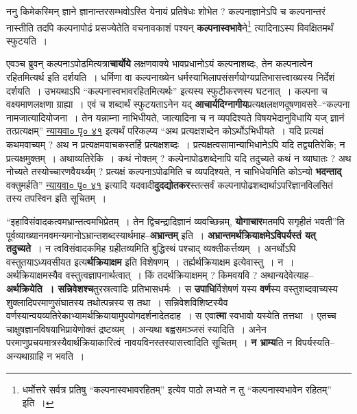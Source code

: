 \documentclass[article,12pt,a4paper]{memoir}
\begin{document}
	  \pstart ननु किमेकस्मिन् ज्ञाने ज्ञानान्तरसम्भवोऽस्ति येनायं प्रतिषेधः शोभेत ? कल्पनाज्ञानेऽपि च कल्पनान्तरं नास्तीति तदपि कल्पनापोढं प्रसज्येतेति वचनावकाशं पश्यन् \textbf{कल्पनास्वभावे}ने\footnote{धर्मोत्तरे सर्वत्र प्रतिषु “कल्पनास्वभावरहितम्” इत्येव पाठो लभ्यते न तु “कल्पनास्वभावेन रहितम्” इति ।} त्यादिनाऽस्य विवक्षितमर्थं स्फुटयति ।
	\pend
      

	  \pstart एवञ्च ब्रुवन् कल्पनाऽपोढमित्यत्रा\textbf{चार्योये} लक्षणवाक्ये भावप्रधानोऽयं कल्पनाशब्दः, तेन कल्पनात्वेन रहितमित्यर्थ इति दर्शयति । धर्मिणा वा कल्पनाख्येन धर्मस्याभिलापसंसर्गयोग्यप्रतिभासत्त्वाख्यस्य निर्देशं दर्शयति । उभयथाऽपि “कल्पनास्वभावरहितमित्यर्थः” इत्यस्य स्फुटीकरणस्य घटनात् । कल्पना च वक्ष्यमाणलक्षणा ग्राह्या । एवं च शब्दार्थं स्फुटयताऽनेन यद् \textbf{आचार्यदिग्नागीय}प्रत्यक्षलक्षणदूषणावसरे--“कल्पना नामजात्यादियोजना । तेन यन्नाम्ना नाभिधीयते, जात्यादिना च न व्यपदिश्यते विषयभेदानुविधायि यज् ज्ञानं तत्प्रत्यक्षम्” \href{http://http://sarit.indology.info/?cref=nv.1.1.p44.1}{न्यायवा० पृ० ४१} इत्यर्थं परिकल्प्य “अथ प्रत्यक्षशब्देन कोऽर्थोऽभिधीयते । यदि प्रत्यक्षं कथमवाच्यम् ? अथ न प्रत्यक्षमवाचकस्तर्हि प्रत्यक्षशब्दः । प्रत्यक्षत्वसामान्याभिधानेऽपि यदि तद्व्यतिरेकि; न प्रत्यक्षमुक्तम् । अथाव्यतिरेकि । कथं नोक्तम् ? कल्पेनापोढशब्देनापि यदि तदुच्यते कथं न व्याघातः ? अथ नोच्यते तस्योच्चारणवैयर्थ्यम् ? प्रत्यक्षं कल्पनाऽपोढमिति च व्यपदिश्यते, न चाभिधेयमिति कोऽन्यो \textbf{भदन्ताद्} वक्तुमर्हति” \href{http://http://sarit.indology.info/?cref=nv.1.1.p44-6-12}{न्यायवा० पृ० ४१} इत्यादि यदवादी\textbf{दुदद्योतकर}स्तत्सर्वं कल्पनापोढशब्दार्थाऽपरिज्ञानविलसितं तस्य तपस्विन इति सूचितम् ।
	\pend
      

	  \pstart “इहाविसंवादकत्वमभ्रान्तत्वमभिप्रेतम् । तेन द्विचन्द्रादिज्ञानं व्यवच्छिन्नम्, \textbf{योगाचार}मतमपि सगृहीतं भवती”ति पूर्वव्याख्यानमवमन्यमानोऽभ्रान्तशब्दस्यार्थमाह--\textbf{अभ्रान्तम्} इति । \textbf{अभ्रान्तमर्थक्रियाक्षमेऽविपर्यस्तं यत् तदुच्यते} । न त्वविसंवादकमिह ग्रहीतव्यमिति बुद्धिस्थं पश्चाद् व्यक्तीकर्त्तव्यम् । अनर्थोऽपि वस्तुतयाऽध्यवसीयत इत्य\textbf{र्थक्रियाक्षम} इति विशेषणम् । तर्ह्यर्थक्रियाक्षम इत्येवास्तु । न । अर्थक्रियाक्षमस्यैव वस्तुत्वज्ञापनार्थत्वात् । किं तदर्थक्रियाक्षमम् ? किमवयवि ? अथान्यदेवेत्याह--\textbf{अर्थक्रियेति । सन्निवेशश्च}तुरस्रत्वादिः प्रतिभासधर्मः । स \textbf{उपाधि}र्विशेषणं यस्य \textbf{वर्ण}स्य वस्तुशब्दवाच्यस्य शुक्लादिपरमाणुसंघातस्य तथोत्पन्नस्य स तथा । सन्निवेशविशिष्टस्यैव वर्णस्यान्वयव्यतिरेकाभ्यामर्थक्रियायामुपयोगदर्शनादेतदाह । स एवा\textbf{त्मा} स्वभावो यस्येति तत्तथा । एतच्च चाक्षुषज्ञानविषयाभिप्रायेणोक्तं द्रष्टव्यम् । अन्यथा बह्वसमञ्जसं स्यादिति । अनेन परमाणुप्रचयमात्रस्यैवार्थक्रि\leavevmode{}याकारित्वं नावयविनस्तस्यासत्त्वादिति सूचितम् । \textbf{न भ्राम्य}ति न विपर्यस्यति--अन्यथाग्राहि न भवति ।
	\pend
      
\end{document}
